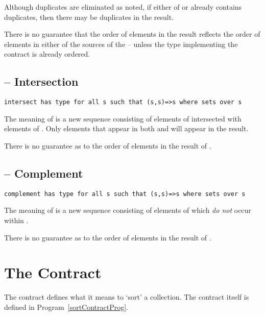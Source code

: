 \begin{aside}
Although duplicates are eliminated as noted, if either of  or  already contains duplicates, then there may be duplicates in the result.
\end{aside}

\begin{aside}
There is no guarantee that the order of elements in the result reflects the order of elements in either of the sources of the  -- unless the type implementing the  contract is already ordered.
\end{aside}

\subsection{ -- Intersection}
\label{intersectFunction}
\begin{lstlisting}
intersect has type for all s such that (s,s)=>s where sets over s
\end{lstlisting}
The meaning of  is a new sequence consisting of elements of  intersected with elements of . Only elements that appear in both  and  will appear in the result.

\begin{aside}
There is no guarantee as to the order of elements in the result of .
\end{aside}

\subsection{ -- Complement}
\label{complementFunction}
\begin{lstlisting}
complement has type for all s such that (s,s)=>s where sets over s
\end{lstlisting}
The meaning of  is a new sequence consisting of elements of  which \emph{do not} occur within .

\begin{aside}
There is no guarantee as to the order of elements in the result of .
\end{aside}


\section{The  Contract}
\label{sortingContract}
The  contract defines what it means to `sort' a collection. The contract itself is defined in Program~\vref{sortContractProg}.


